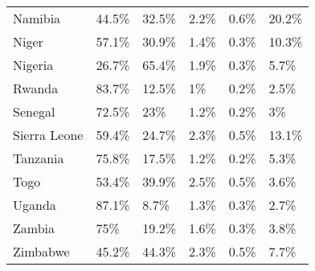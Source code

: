 \begin{table}[ht]
\begin{tabular}{llllll}
  Namibia & 44.5\% & 32.5\% & 2.2\% & 0.6\% & 20.2\% \\ 
  Niger & 57.1\% & 30.9\% & 1.4\% & 0.3\% & 10.3\% \\ 
  Nigeria & 26.7\% & 65.4\% & 1.9\% & 0.3\% & 5.7\% \\ 
  Rwanda & 83.7\% & 12.5\% & 1\% & 0.2\% & 2.5\% \\ 
  Senegal & 72.5\% & 23\% & 1.2\% & 0.2\% & 3\% \\ 
  Sierra Leone & 59.4\% & 24.7\% & 2.3\% & 0.5\% & 13.1\% \\ 
  Tanzania & 75.8\% & 17.5\% & 1.2\% & 0.2\% & 5.3\% \\ 
  Togo & 53.4\% & 39.9\% & 2.5\% & 0.5\% & 3.6\% \\ 
  Uganda & 87.1\% & 8.7\% & 1.3\% & 0.3\% & 2.7\% \\ 
  Zambia & 75\% & 19.2\% & 1.6\% & 0.3\% & 3.8\% \\ 
  Zimbabwe & 45.2\% & 44.3\% & 2.3\% & 0.5\% & 7.7\% \\ 
   \hline
\end{tabular}
\end{table}
